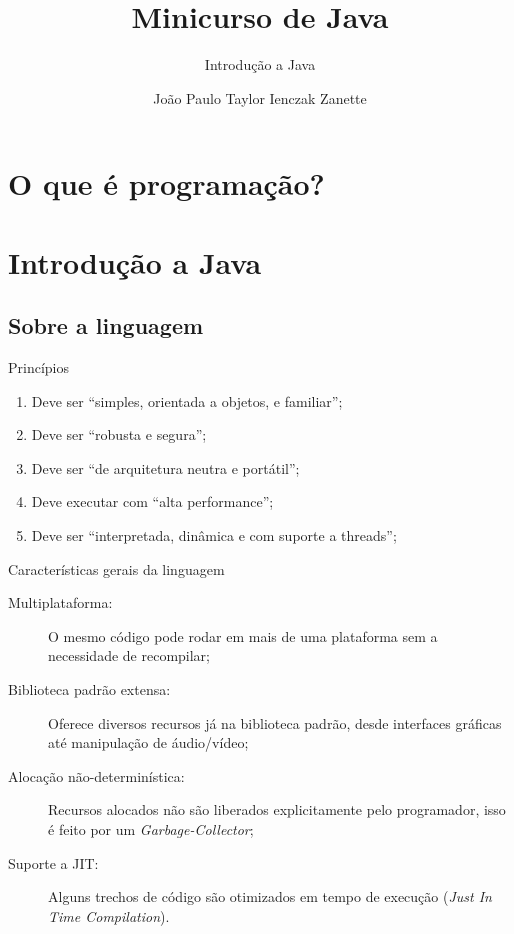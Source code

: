 \documentclass{beamer}
\title{Minicurso de Java}
\subtitle{Introdução a Java}
\author{João Paulo Taylor Ienczak Zanette}
\begin{document}
\maketitle

\section{O que é programação?}

\section{Introdução a Java}
\subsection{Sobre a linguagem}

\begin{frame}{Princípios}
    \begin{enumerate}
        \item Deve ser ``simples, orientada a objetos, e familiar'';
        \item Deve ser ``robusta e segura'';
        \item Deve ser ``de arquitetura neutra e portátil'';
        \item Deve executar com ``alta performance'';
        \item Deve ser ``interpretada, dinâmica e com suporte a threads'';
    \end{enumerate}
\end{frame}


\begin{frame}{Características gerais da linguagem}

    \begin{description}
        \item[Multiplataforma:] O mesmo código pode rodar em mais de uma plataforma
            sem a necessidade de recompilar;
        \item[Biblioteca padrão extensa:] Oferece diversos recursos já na
            biblioteca padrão, desde interfaces gráficas até manipulação de
            áudio/vídeo;
        \item[Alocação não-determinística:] Recursos alocados não são liberados
            explicitamente pelo programador, isso é feito por um
            \emph{Garbage-Collector};
        \item[Suporte a JIT:] Alguns trechos de código são otimizados em tempo de
            execução (\textit{Just In Time Compilation}).
    \end{description}


\end{frame}
\end{document}
